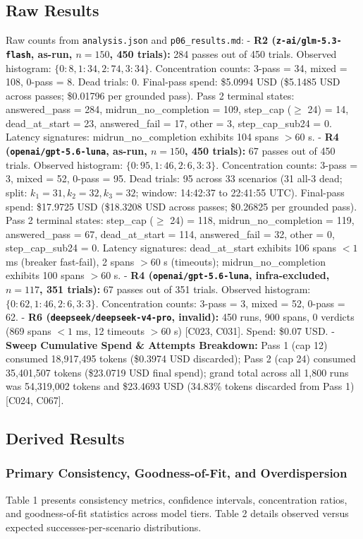 \documentclass[11pt,letterpaper]{article}
\begin{document}
\subsection{Raw Results}
Raw counts from \texttt{analysis.json} and \texttt{p06\_results.md}:
- \textbf{R2 (\texttt{z-ai/glm-5.3-flash}, as-run, $n=150$, 450 trials):} 284 passes out of 450 trials. Observed histogram: $\{0: 8, 1: 34, 2: 74, 3: 34\}$. Concentration counts: 3-pass = 34, mixed = 108, 0-pass = 8. Dead trials: 0. Final-pass spend: \$5.0994 USD (\$5.1485 USD across passes; \$0.01796 per grounded pass). Pass 2 terminal states: answered\_pass = 284, midrun\_no\_completion = 109, step\_cap ($\ge$ 24) = 14, dead\_at\_start = 23, answered\_fail = 17, other = 3, step\_cap\_sub24 = 0. Latency signatures: midrun\_no\_completion exhibits 104 spans $>60$ s.
- \textbf{R4 (\texttt{openai/gpt-5.6-luna}, as-run, $n=150$, 450 trials):} 67 passes out of 450 trials. Observed histogram: $\{0: 95, 1: 46, 2: 6, 3: 3\}$. Concentration counts: 3-pass = 3, mixed = 52, 0-pass = 95. Dead trials: 95 across 33 scenarios (31 all-3 dead; split: $k_1=31, k_2=32, k_3=32$; window: 14:42:37 to 22:41:55 UTC). Final-pass spend: \$17.9725 USD (\$18.3208 USD across passes; \$0.26825 per grounded pass). Pass 2 terminal states: step\_cap ($\ge$ 24) = 118, midrun\_no\_completion = 119, answered\_pass = 67, dead\_at\_start = 114, answered\_fail = 32, other = 0, step\_cap\_sub24 = 0. Latency signatures: dead\_at\_start exhibits 106 spans $<1$ ms (breaker fast-fail), 2 spans $>60$ s (timeouts); midrun\_no\_completion exhibits 100 spans $>60$ s.
- \textbf{R4 (\texttt{openai/gpt-5.6-luna}, infra-excluded, $n=117$, 351 trials):} 67 passes out of 351 trials. Observed histogram: $\{0: 62, 1: 46, 2: 6, 3: 3\}$. Concentration counts: 3-pass = 3, mixed = 52, 0-pass = 62.
- \textbf{R6 (\texttt{deepseek/deepseek-v4-pro}, invalid):} 450 runs, 900 spans, 0 verdicts (869 spans $<1$ ms, 12 timeouts $>60$ s) [C023, C031]. Spend: \$0.07 USD.
- \textbf{Sweep Cumulative Spend \& Attempts Breakdown:} Pass 1 (cap 12) consumed 18,917,495 tokens (\$0.3974 USD discarded); Pass 2 (cap 24) consumed 35,401,507 tokens (\$23.0719 USD final spend); grand total across all 1,800 runs was 54,319,002 tokens and \$23.4693 USD (34.83\% tokens discarded from Pass 1) [C024, C067].

\subsection{Derived Results}

\subsubsection*{Primary Consistency, Goodness-of-Fit, and Overdispersion}
Table 1 presents consistency metrics, confidence intervals, concentration ratios, and goodness-of-fit statistics across model tiers. Table 2 details observed versus expected successes-per-scenario distributions.
\end{document}
